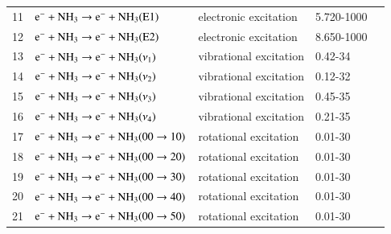 \begin{table}
\begin{threeparttable}
\begin{tabular*}{\textwidth}{l@{\extracolsep{\fill}}llll}
      11 & $\rm e^- + NH_3 \rightarrow e^- + NH_3(E1)$  &  electronic excitation   &  5.720-1000 &\cite{lxc:2024:morgan}\\ 
      12 & $\rm e^- + NH_3 \rightarrow e^- + NH_3(E2)$  &  electronic excitation   &  8.650-1000 &\cite{lxc:2024:morgan}\\ 
      \midrule
      13 & $\rm e^- + NH_3 \rightarrow e^- + NH_3(\nu_1)$  &  vibrational excitation   &  0.42-34 &\cite{psst:2023:snoeckx}\\  
      14 & $\rm e^- + NH_3 \rightarrow e^- + NH_3(\nu_2)$  &  vibrational excitation   &  0.12-32 &\cite{psst:2023:snoeckx}\\ 
      15 & $\rm e^- + NH_3 \rightarrow e^- + NH_3(\nu_3)$  &  vibrational excitation   &  0.45-35 &\cite{psst:2023:snoeckx}\\ 
      16 & $\rm e^- + NH_3 \rightarrow e^- + NH_3(\nu_4)$  &  vibrational excitation   &  0.21-35 &\cite{psst:2023:snoeckx}\\ 
      \midrule
      17 & $\rm e^- + NH_3 \rightarrow e^- + NH_3(00\rightarrow10)$  &  rotational excitation   &  0.01-30 & \cite{psst:2023:snoeckx}\\ 
      18 & $\rm e^- + NH_3 \rightarrow e^- + NH_3(00\rightarrow20)$  &  rotational excitation   &  0.01-30 &\cite{psst:2023:snoeckx}\\ 
      19 & $\rm e^- + NH_3 \rightarrow e^- + NH_3(00\rightarrow30)$  &  rotational excitation   &  0.01-30 &\cite{psst:2023:snoeckx}\\ 
      20 & $\rm e^- + NH_3 \rightarrow e^- + NH_3(00\rightarrow40)$  &  rotational excitation   &  0.01-30 &\cite{psst:2023:snoeckx}\\ 
      21 & $\rm e^- + NH_3 \rightarrow e^- + NH_3(00\rightarrow50)$  &  rotational excitation   &  0.01-30 &\cite{psst:2023:snoeckx}\\ 
    \bottomrule
    \end{tabular*}
   \end{threeparttable}
\end{table}
%
